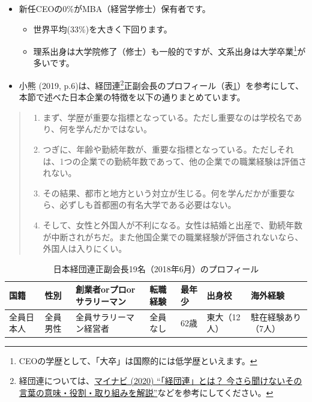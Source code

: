 \documentclass[
]{book}
\providecommand{\tightlist}{%
  \setlength{\itemsep}{0pt}\setlength{\parskip}{0pt}}
\begin{document}
\begin{itemize}
\item
  新任CEOの0\%がMBA（経営学修士）保有者です。

  \begin{itemize}
  \item
    世界平均(33\%)を大きく下回ります。
  \item
    理系出身は大学院修了（修士）も一般的ですが、文系出身は大学卒業\footnote{CEOの学歴として、「大卒」は国際的には低学歴といえます。}が多いです。
  \end{itemize}
\end{itemize}

\begin{itemize}
\tightlist
\item
  小熊 (2019, p.6)は、経団連\footnote{経団連については、\href{https://gakumado.mynavi.jp/style/articles/46464}{マイナビ (2020) ``「経団連」とは？ 今さら聞けないその言葉の意味・役割・取り組みを解説''}などを参考にしてください。}正副会長のプロフィール（表\ref{tab:keidanren}）を参考にして、本節で述べた日本企業の特徴を以下の通りまとめています。
\end{itemize}

\begin{quote}
\begin{enumerate}
\def\labelenumi{\arabic{enumi}.}
\tightlist
\item
  まず、学歴が重要な指標となっている。ただし重要なのは学校名であり、何を学んだかではない。\\
\item
  つぎに、年齢や勤続年数が、重要な指標となっている。ただしそれは、1つの企業での勤続年数であって、他の企業での職業経験は評価されない。\\
\item
  その結果、都市と地方という対立が生じる。何を学んだかが重要なら、必ずしも首都圏の有名大学である必要はない。\\
\item
  そして、女性と外国人が不利になる。女性は結婚と出産で、勤続年数が中断されがちだ。また他国企業での職業経験が評価されないなら、外国人は入りにくい。
\end{enumerate}
\end{quote}

\begin{table}

\caption{\label{tab:keidanren}日本経団連正副会長19名（2018年6月）のプロフィール}
\centering
\begin{tabular}[t]{>{\raggedright\arraybackslash}p{6em}|>{\raggedright\arraybackslash}p{6em}|l|>{\raggedright\arraybackslash}p{6em}|>{\raggedright\arraybackslash}p{6em}|>{\raggedright\arraybackslash}p{6em}|>{\raggedright\arraybackslash}p{6em}}
\hline
国籍 & 性別 & 創業者orプロorサラリーマン & 転職経験 & 最年少 & 出身校 & 海外経験\\
\hline
全員日本人 & 全員男性 & 全員サラリーマン経営者 & 全員なし & 62歳 & 東大（12人） & 駐在経験あり（7人）\\
\hline
\end{tabular}
\end{table}
\end{document}
